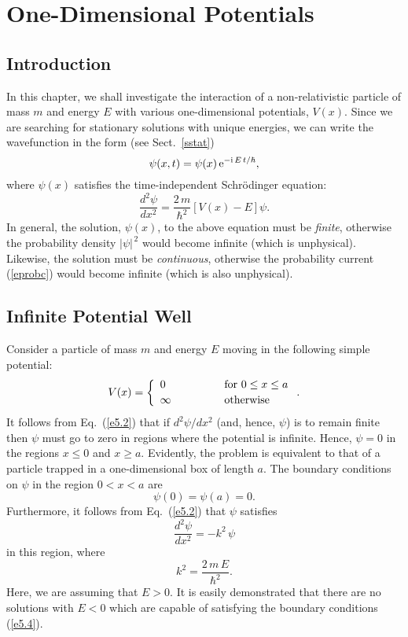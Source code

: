 \chapter{One-Dimensional Potentials}\label{s5}
\section{Introduction}
In this chapter, we shall investigate the interaction of
a non-relativistic particle of mass $m$ and energy $E$ with various
one-dimensional potentials, $V(x)$. Since we are searching for stationary
 solutions with unique energies, we can write the wavefunction in the form (see Sect.~\ref{sstat})
\begin{equation}
\psi(x,t) = \psi(x)\,{\rm e}^{-{\rm i}\,E\,t/\hbar},
\end{equation} 
where $\psi(x)$ satisfies the time-independent Schr\"{o}dinger equation:
\begin{equation}\label{e5.2}
\frac{d^2 \psi}{d x^2} = \frac{2\,m}{\hbar^2}
\left[V(x)-E\right]\psi.
\end{equation}
In general, the solution, $\psi(x)$,  to the above equation must be 
{\em finite}, otherwise the probability density $|\psi|^{\,2}$ would
become infinite (which is unphysical). Likewise, the solution must  be
{\em continuous}, otherwise the
probability current (\ref{eprobc}) would become infinite (which is also
unphysical).

\section{Infinite Potential Well}\label{s5.2}
Consider a particle of mass $m$ and energy $E$ moving in the following simple potential:
\begin{equation}
V(x) = \left\{\begin{array}{lcl}
0&\mbox{\hspace{1cm}}&\mbox{for $0\leq x\leq a$}\\[0.5ex]
\infty&&\mbox{otherwise}
\end{array}\right..
\end{equation}
It follows from Eq.~(\ref{e5.2}) that if $d^2\psi/d x^2$ (and, hence, $\psi$) is
to remain finite then $\psi$ must go to zero in regions where the potential
is infinite. Hence, $\psi=0$ in the regions $x\leq 0$ and $x\geq a$.
Evidently, the problem is equivalent to that of a particle trapped in a
one-dimensional box of length $a$.
The boundary conditions on $\psi$ in
the region $0<x<a$ are 
\begin{equation}\label{e5.4}
\psi(0) = \psi(a) = 0.
\end{equation}
Furthermore, it follows from Eq.~(\ref{e5.2}) that $\psi$ satisfies
\begin{equation}\label{e5.5}
\frac{d^2 \psi}{d x^2} = - k^2\,\psi
\end{equation}
in this  region, where
\begin{equation}\label{e5.6}
k^2 = \frac{2\,m\,E}{\hbar^2}.
\end{equation}
Here, we are assuming that $E>0$. It is easily demonstrated that there are
no solutions with $E<0$ which are capable of satisfying the boundary conditions (\ref{e5.4}).

